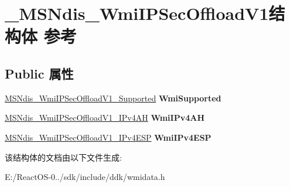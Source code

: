 \hypertarget{struct___m_s_ndis___wmi_i_p_sec_offload_v1}{}\section{\+\_\+\+M\+S\+Ndis\+\_\+\+Wmi\+I\+P\+Sec\+Offload\+V1结构体 参考}
\label{struct___m_s_ndis___wmi_i_p_sec_offload_v1}
\subsection*{Public 属性}
\begin{DoxyCompactItemize}
\item 
\mbox{\label{struct___m_s_ndis___wmi_i_p_sec_offload_v1_a6ce2eeab35202b9d2fc989017cd3e561}} 
\hyperlink{struct___m_s_ndis___wmi_i_p_sec_offload_v1___supported}{M\+S\+Ndis\+\_\+\+Wmi\+I\+P\+Sec\+Offload\+V1\+\_\+\+Supported} {\bfseries Wmi\+Supported}
\item 
\mbox{\label{struct___m_s_ndis___wmi_i_p_sec_offload_v1_aa14f296e1bc77e8f87a7f1c00f25c2de}} 
\hyperlink{struct___m_s_ndis___wmi_i_p_sec_offload_v1___i_pv4_a_h}{M\+S\+Ndis\+\_\+\+Wmi\+I\+P\+Sec\+Offload\+V1\+\_\+\+I\+Pv4\+AH} {\bfseries Wmi\+I\+Pv4\+AH}
\item 
\mbox{\label{struct___m_s_ndis___wmi_i_p_sec_offload_v1_a423cf32ab7175f95d207bf5b540a3e58}} 
\hyperlink{struct___m_s_ndis___wmi_i_p_sec_offload_v1___i_pv4_e_s_p}{M\+S\+Ndis\+\_\+\+Wmi\+I\+P\+Sec\+Offload\+V1\+\_\+\+I\+Pv4\+E\+SP} {\bfseries Wmi\+I\+Pv4\+E\+SP}
\end{DoxyCompactItemize}


该结构体的文档由以下文件生成\+:\begin{DoxyCompactItemize}
\item 
E\+:/\+React\+O\+S-\/0../sdk/include/ddk/wmidata.\+h\end{DoxyCompactItemize}
